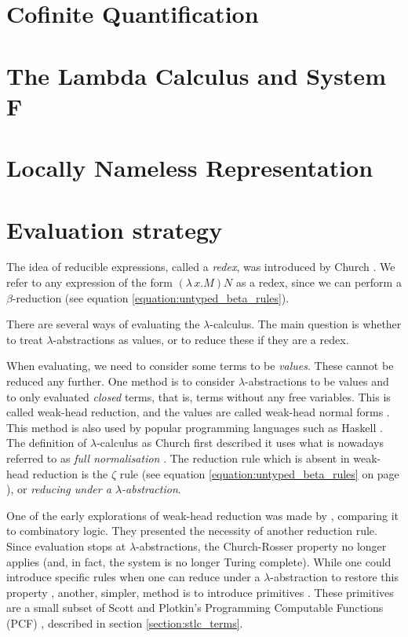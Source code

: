 \documentclass[logo,bsc,singlespacing,parskip,online]{infthesis}
\begin{document}
\section{Cofinite Quantification}



\section{The Lambda Calculus and System F}


\section{Locally Nameless Representation}


\section{Evaluation strategy}
\label{section:evaluation_strategy}
The idea of reducible expressions, called a \textit{redex}, was introduced by Church
\cite[p.~56]{pierce_types_2002}. We refer to any expression of the form $(\lambda \, x. M) N$ as a
redex, since we can perform a $\beta$-reduction (see equation \ref{equation:untyped_beta_rules}).

There are several ways of evaluating the $\lambda$-calculus. The main question is whether to treat
$\lambda$-abstractions as values, or to reduce these if they are a redex.

When evaluating, we need to consider some terms to be \textit{values}. These cannot be reduced any
further. One method is to consider $\lambda$-abstractions to be values and to only evaluated
\textit{closed} terms, that is, terms without any free variables. This is called weak-head
reduction, and the values are called weak-head normal forms \citep{wadler_programming_2022}. This
method is also used by popular programming languages such as Haskell \citep{hutchison_sharing_2005}.
The definition of $\lambda$-calculus as Church first described it uses what is nowadays referred to
as \textit{full normalisation} \citep{wadler_programming_2022}. The reduction rule which is absent in
weak-head reduction is the $\zeta$ rule (see equation \ref{equation:untyped_beta_rules} on page
\pageref{equation:untyped_beta_rules}), or \textit{reducing under a $\lambda$-abstraction}.

One of the early explorations of weak-head reduction was made by \citet{cagman_combinatory_1998},
comparing it to combinatory logic. They presented the necessity of another reduction rule. Since
evaluation stops at $\lambda$-abstractions, the Church-Rosser property no longer applies (and, in
fact, the system is no longer Turing complete). While one could introduce specific rules when one
can reduce under a $\lambda$-abstraction to restore this property \citep{hutchison_sharing_2005},
another, simpler, method is to introduce primitives \citep{wadler_programming_2022}. These
primitives are a small subset of Scott and Plotkin's Programming Computable Functions (PCF)
\citep{plotkin_lcf_1977}, described in section \ref{section:stlc_terms}.
\end{document}
